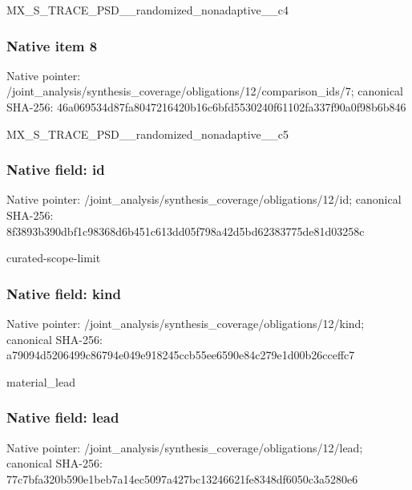 \documentclass[10pt,a4paper]{article}
\begin{document}
\begingroup\raggedright\sloppy MX\_\allowbreak{}S\_\allowbreak{}TRACE\_\allowbreak{}PSD\_\allowbreak{}\_\allowbreak{}randomized\_\allowbreak{}nonadaptive\_\allowbreak{}\_\allowbreak{}c4\par\endgroup

\subsubsection{Native item 8}
Native pointer: /joint\_\allowbreak{}analysis/synthesis\_\allowbreak{}coverage/obligations/12/comparison\_\allowbreak{}ids/7; canonical SHA-256: 46a069534d87fa8047216420b16c6bfd5530240f61102fa337f90a0f98b6b846

\begingroup\raggedright\sloppy MX\_\allowbreak{}S\_\allowbreak{}TRACE\_\allowbreak{}PSD\_\allowbreak{}\_\allowbreak{}randomized\_\allowbreak{}nonadaptive\_\allowbreak{}\_\allowbreak{}c5\par\endgroup

\subsubsection{Native field: id}
Native pointer: /joint\_\allowbreak{}analysis/synthesis\_\allowbreak{}coverage/obligations/12/id; canonical SHA-256: 8f3893b390dbf1c98368d6b451c613dd05f798a42d5bd62383775de81d03258c

\begingroup\raggedright\sloppy curated-scope-limit\par\endgroup

\subsubsection{Native field: kind}
Native pointer: /joint\_\allowbreak{}analysis/synthesis\_\allowbreak{}coverage/obligations/12/kind; canonical SHA-256: a79094d5206499c86794e049e918245ccb55ee6590e84c279e1d00b26cceffc7

\begingroup\raggedright\sloppy material\_\allowbreak{}lead\par\endgroup

\subsubsection{Native field: lead}
Native pointer: /joint\_\allowbreak{}analysis/synthesis\_\allowbreak{}coverage/obligations/12/lead; canonical SHA-256: 77c7bfa320b590e1beb7a14ec5097a427bc13246621fe8348df6050c3a5280e6
\end{document}
